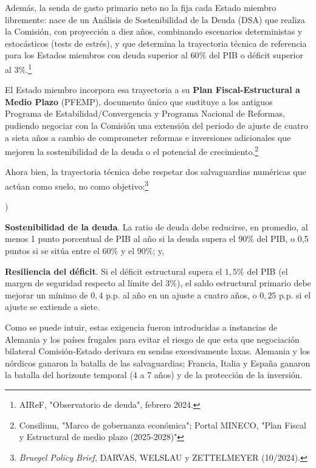 \documentclass[10pt,a4paper]{article}
\newcounter{alphaitem}
\newenvironment{la}
      {\begin{list}{\alph{alphaitem})}{%
          \usecounter{alphaitem}%
          \setlength{\leftmargin}{1cm}%
          \setlength{\parskip}{3pt}%
          \setlength{\itemsep}{0pt}%
          \setlength{\parsep}{0pt}%
      }}
      {\end{list}}
\begin{document}
Además, la senda de gasto primario neto no la fija cada Estado miembro libremente: nace de un Análisis de Sostenibilidad de la Deuda (DSA) que realiza la Comisión, con proyección a diez años, combinando escenarios deterministas y estocásticos (tests de estrés), y que determina la trayectoria técnica de referencia para los Estados miembros con deuda superior al $60\%$ del PIB o déficit superior al $3\%$.\footnote{AIReF, "Observatorio de deuda", febrero 2024.} 

El Estado miembro incorpora esa trayectoria a su \textbf{Plan Fiscal-Estructural a Medio Plazo} (PFEMP), documento único que sustituye a los antiguos Programa de Estabilidad/Convergencia y Programa Nacional de Reformas, pudiendo negociar con la Comisión una extensión del periodo de ajuste de cuatro a sieta años a cambio de comprometer reformas e inversiones adicionales que mejoren la sostenibilidad de la deuda o el potencial de crecimiento.\footnote{%
    Consilium, "Marco de gobernanza económica"; Portal MINECO, "Plan Fiscal y Estructural de medio plazo (2025-2028)"
}

Ahora bien, la trayectoria técnica debe respetar dos salvaguardias numéricas que actúan como suelo, no como objetivo:\footnote{\textit{Bruegel Policy Brief}, DARVAS, WELSLAU y ZETTELMEYER (10/2024).
}
\begin{la}
    \item \textbf{Sostenibilidad de la deuda}. La ratio de deuda debe reducirse, en promedio, al menos 1 punto porcentual de PIB al año si la deuda supera el $90\%$ del PIB, o 0,5 puntos si se sitúa entre el $60\%$ y el $90\%$; y,
    \item \textbf{Resiliencia del déficit}. Si el déficit estructural supera el $1,5\%$ del PIB (el margen de seguridad respecto al límite del $3\%$), el saldo estructural primario debe mejorar un mínimo de $0,4$ p.p. al año en un ajuste a cuatro años, o $0,25$ p.p. si el ajuste se extiende a siete.
\end{la}

Como se puede intuir, estas exigencia fueron introducidas a instancias de Alemania y los países frugales para evitar el riesgo de que esta que negociación bilateral Comisión-Estado derivara en sendas excesivamente laxas. Alemania y los nórdicos ganaron la batalla de las salvaguardias; Francia, Italia y España ganaron la batalla del horizonte temporal (4 a 7 años) y de la protección de la inversión.
\end{document}
